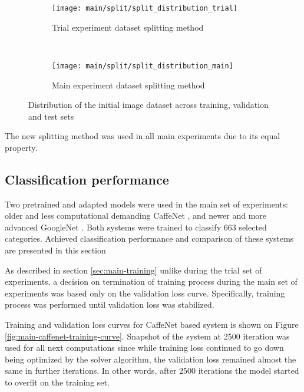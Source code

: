     \begin{figure}[H]
    \centering
    \begin{subfigure}[a]{0.9\textwidth}
        \texttt{[image: main/split/split\_distribution\_trial]}
        \caption{Trial experiment dataset splitting method}
        \label{fig:main-split-distribution-trial}
    \end{subfigure}
    \\
    \begin{subfigure}[a]{0.9\textwidth}
        \texttt{[image: main/split/split\_distribution\_main]}
        \caption{Main experiment dataset splitting method}
        \label{fig:main-split-distribution-main}
    \end{subfigure}
    \caption{Distribution of the initial image dataset across training, validation and test sets}
    \label{fig:main-split-distribution}
    \end{figure}
    
    The new splitting method was used in all main experiments due to its equal property.
    
\subsection{Classification performance}
    Two pretrained and adapted models were used in the main set of experiments: older and less computational demanding CaffeNet \cite{CaffeNet}, and newer and more advanced GoogleNet \cite{Szegedy2015GoingDeeper}. Both systems were trained to classify 663 selected categories. Achieved classification performance and comparison of these systems are presented in this section
    
    As described in section \ref{sec:main-training} unlike during the trial set of experiments, a decision on termination of training process during the main set of experiments was based only on the validation loss curve. Specifically, training process was performed until validation loss was stabilized.
    
    Training and validation loss curves for CaffeNet based system is shown on Figure \ref{fig:main-caffenet-training-curve}. Snapshot of the system at 2500 iteration was used for all next computations since while training loss continued to go down being optimized by the solver algorithm, the validation loss remained almost the same in further iterations. In other words, after 2500 iterations the model started to overfit on the training set.
    
